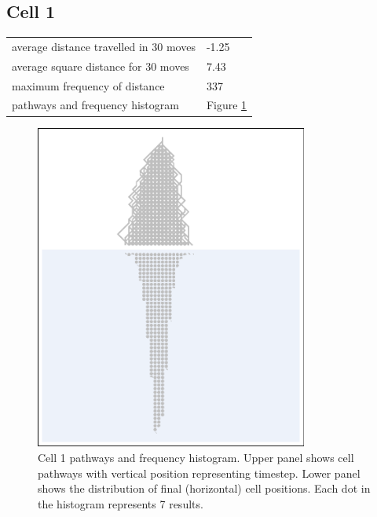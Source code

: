 \documentclass[11pt,a4paper]{article}
\newcommand \bt{\begin{longtable}{p{0.65\textwidth}p{0.25\textwidth}}}
\newcommand \et{\end{longtable}}
\begin{document}
\subsection*{Cell 1}
\bt
average distance travelled in 30 moves &  -1.25\\
average square distance for 30 moves & 7.43\\
maximum frequency of distance & 337\\
pathways and frequency histogram & Figure \ref{fig1}
\et
\begin{figure}[htbp]
\begin{center}
\includegraphics[width=0.8\textwidth]{CA30_R40L40_1.eps}
\caption{Cell 1 pathways and frequency histogram. Upper panel shows cell pathways with vertical position representing timestep. 
Lower panel shows the distribution of final (horizontal) cell positions. Each dot in the histogram represents 7 results.}
\label{fig1}
\end{center}
\end{figure}
\end{document}
